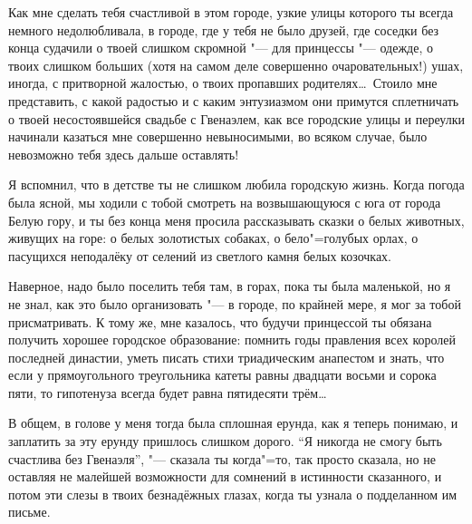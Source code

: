 Как мне сделать тебя счастливой в этом городе, узкие улицы которого ты всегда
немного недолюбливала, в городе, где у тебя не было друзей, где соседки без
конца судачили о твоей слишком скромной "--- для принцессы "--- одежде, о твоих
слишком больших (хотя на самом деле совершенно очаровательных!) ушах, иногда, с
притворной жалостью, о твоих пропавших родителях\ldots\
Стоило мне представить, с какой радостью и с каким энтузиазмом они примутся
сплетничать о твоей несостоявшейся свадьбе с Гвенаэлем, как все городские улицы
и переулки начинали казаться мне совершенно невыносимыми, во всяком случае, было
невозможно тебя здесь дальше оставлять!

Я вспомнил, что в детстве ты не слишком любила городскую жизнь.
Когда погода была ясной, мы ходили с тобой смотреть на возвышающуюся с юга от
города Белую гору, и ты без конца меня просила рассказывать сказки о белых
животных, живущих на горе: о белых золотистых собаках, о бело"=голубых орлах,
о пасущихся неподалёку от селений из светлого камня белых козочках.

Наверное, надо было поселить тебя там, в горах, пока ты была маленькой, но я не
знал, как это было организовать "--- в городе, по крайней мере, я мог за тобой
присматривать.
К тому же, мне казалось, что будучи принцессой ты обязана получить хорошее
городское образование: помнить годы правления всех королей последней династии,
уметь писать стихи триадическим анапестом и знать, что если у прямоугольного
треугольника катеты равны двадцати восьми и сорока пяти, то гипотенуза всегда
будет равна пятидесяти трём\ldots

В общем, в голове у меня тогда была сплошная ерунда, как я теперь понимаю, и
заплатить за эту ерунду пришлось слишком дорого. \enquote{Я никогда не смогу
быть счастлива без Гвенаэля}, "--- сказала ты когда"=то, так просто сказала, но
не оставляя не малейшей возможности для сомнений в истинности сказанного, и
потом эти слезы в твоих безнадёжных глазах, когда ты узнала о подделанном им
письме.

